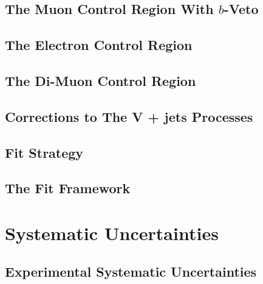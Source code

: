 \documentclass[10pt,twoside,cucitura,classica,english,openany]{toptesi}
\begin{document}


\subsection{The Muon Control Region With $b$-Veto}
\label{sec:muon-cr-bveto}



\subsection{The Electron Control Region}
\label{sec:ele-cr}



\subsection{The Di-Muon Control Region}
\label{sec:dimuon-cr}



\subsection{Corrections to The V + jets Processes}
\label{sec:corrections-vjets}



\subsection{Fit Strategy}
\label{sec:fit-strategy}



\subsection{The Fit Framework}
\label{sec:fit-framework}



\section{Systematic Uncertainties}
\label{sec:syst-uncert-1}



\subsection{Experimental Systematic Uncertainties}
\label{sec:exper-syst-uncert}
\end{document}
